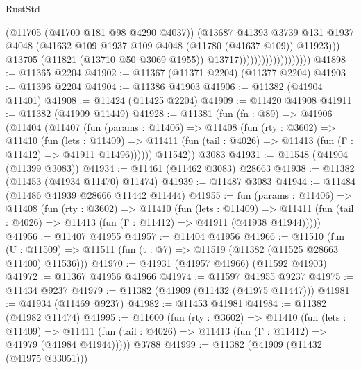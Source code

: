 \begin{lexlean}{RustStd}
\begin{coremodule}
                                            (@11705 (@41700 @181 @98 @4290 @4037))
                                            (@13687
                                              @41393
                                              @3739
                                              @131
                                              @1937
                                              @4048
                                              (@41632
                                                @109
                                                @1937
                                                @109
                                                @4048
                                                (@11780 (@41637 @109))
                                                @11923)))
                                          @13705
                                          (@11821 (@13710 @50 @3069 @1955))
                                          @13717)))))))))))))))))))
@41898 := @11365 @2204
@41902 := @11367 (@11371 @2204) (@11377 @2204)
@41903 := @11396 @2204
@41904 := @11386 @41903
@41906 := @11382 (@41904 @11401)
@41908 := @11424 (@11425 @2204)
@41909 := @11420 @41908
@41911 := @11382 (@41909 @11449)
@41928 := @11381
    (fun (fn : @89) =>
    @41906
      (@11404
        (@11407
          (fun (params : @11406) =>
          @11408
            (fun (rty : @3602) =>
            @11410
              (fun (lets : @11409) =>
              @11411 (fun (tail : @4026) => @11413 (fun (Γ : @11412) => @41911 @11496))))))
        @11542))
    @3083
@41931 := @11548 (@41904 (@11399 @3083))
@41934 := @11461 (@11462 @3083) @28663
@41938 := @11382 (@11453 (@41934 @11470) @11474)
@41939 := @11487 @3083
@41944 := @11484 (@11486 @41939 @28666 @11442 @11444)
@41955 := fun (params : @11406) =>
  @11408
    (fun (rty : @3602) =>
    @11410
      (fun (lets : @11409) =>
      @11411 (fun (tail : @4026) => @11413 (fun (Γ : @11412) => @41911 (@41938 @41944)))))
@41956 := @11407 @41955
@41957 := @11404 @41956
@41966 := @11510
    (fun (U : @11509) => @11511 (fun (t : @7) => @11519 (@11382 (@11525 @28663 @11400) @11536)))
@41970 := @41931 (@41957 @41966) (@11592 @41903)
@41972 := @11367 @41956 @41966
@41974 := @11597 @41955 @9237
@41975 := @11434 @9237
@41979 := @11382 (@41909 (@11432 (@41975 @11447)))
@41981 := @41934 (@11469 @9237)
@41982 := @11453 @41981
@41984 := @11382 (@41982 @11474)
@41995 := @11600
    (fun (rty : @3602) =>
    @11410
      (fun (lets : @11409) =>
      @11411 (fun (tail : @4026) => @11413 (fun (Γ : @11412) => @41979 (@41984 @41944)))))
    @3788
@41999 := @11382 (@41909 (@11432 (@41975 @33051)))

\end{coremodule}
\end{lexlean}
